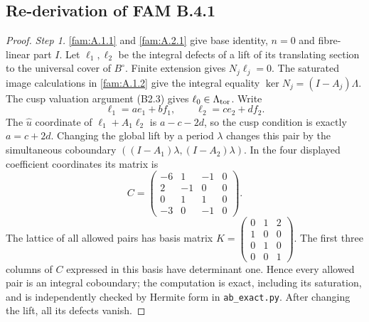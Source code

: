 \subsection{Re-derivation of FAM B.4.1}
\begin{proof}
\par\noindent\textit{Step 1.} \ref{fam:A.1.1} and \ref{fam:A.2.1} give base identity, $n=0$ and fibre-linear part $I$. Let $\ell_1,\ell_2$ be the integral defects of a lift of its translating section to the universal cover of $B^\circ$. Finite extension gives $N_j\ell_j=0$. The saturated image calculations in \ref{fam:A.1.2} give the integral equality $\ker N_j=(I-A_j)\Lambda$. The cusp valuation argument (B2.3) gives $\ell_0\in\Lambda_{\rm tor}$. Write
\[
 \ell_1=ae_1+bf_1,\qquad \ell_2=ce_2+df_2.
\]
The $\widehat u$ coordinate of $\ell_1+A_1\ell_2$ is $a-c-2d$, so the cusp condition is exactly $a=c+2d$. Changing the global lift by a period $\lambda$ changes this pair by the simultaneous coboundary $((I-A_1)\lambda,(I-A_2)\lambda)$. In the four displayed coefficient coordinates its matrix is
\[
 C=\begin{pmatrix}-6&1&-1&0\\2&-1&0&0\\0&1&1&0\\-3&0&-1&0\end{pmatrix}.
\]
The lattice of all allowed pairs has basis matrix
$K=\left(\begin{smallmatrix}0&1&2\\1&0&0\\0&1&0\\0&0&1\end{smallmatrix}\right)$. The first three columns of $C$ expressed in this basis have determinant one. Hence every allowed pair is an integral coboundary; the computation is exact, including its saturation, and is independently checked by Hermite form in \texttt{ab\_exact.py}. After changing the lift, all its defects vanish.


\end{proof}
